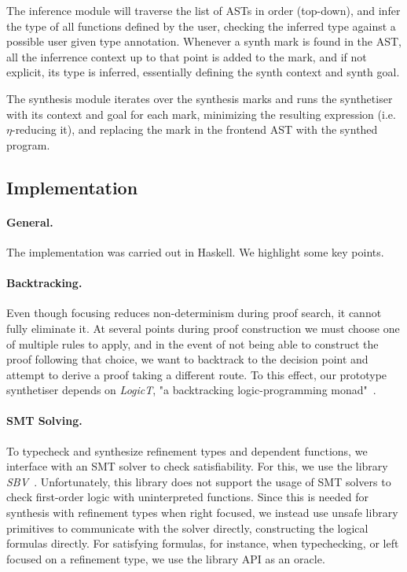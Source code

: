 \documentclass{llncs}
\newcommand{\mypara}[1]{\paragraph{\textbf{#1}.}}
\begin{document}
The inference module will traverse the list of ASTs in order (top-down), and
infer the type of all functions defined by the user, checking the inferred
type against a possible user given type annotation. Whenever a synth mark is
found in the AST, all the inferrence context up to that point is added to the
mark, and if not explicit, its type is inferred, essentially defining the synth
context and synth goal.

The synthesis module iterates over the synthesis marks and runs the
synthetiser with its context and goal for each mark, minimizing the
resulting expression (i.e.~$\eta$-reducing it), and replacing the mark
in the frontend AST with the synthed program.


\subsection{Implementation}

\mypara{General} The implementation was carried out in Haskell. We
highlight some key points.

\mypara{Backtracking} Even though focusing reduces non-determinism
during proof search, it cannot fully eliminate it. At several points
during proof construction we must choose one of multiple rules to
apply, and in the event of not being able to construct the proof
following that choice, we want to backtrack to the decision point and
attempt to derive a proof taking a different route. To this effect,
our prototype synthetiser depends on \emph{LogicT}, "a backtracking
logic-programming monad"~\cite{logict}.

\mypara{SMT Solving} To typecheck and synthesize refinement types and
dependent functions, we interface with an SMT solver to check
satisfiability. For this, we use the library
\emph{SBV}~\cite{sbv}. Unfortunately, this library does not support
the usage of SMT solvers to check first-order logic with uninterpreted
functions. Since this is needed for synthesis with refinement types
when right focused, we instead use unsafe library primitives to
communicate with the solver directly, constructing the logical
formulas directly. For satisfying formulas, for instance, when
typechecking, or left focused on a refinement type, we use the library
API as an oracle.
\end{document}
